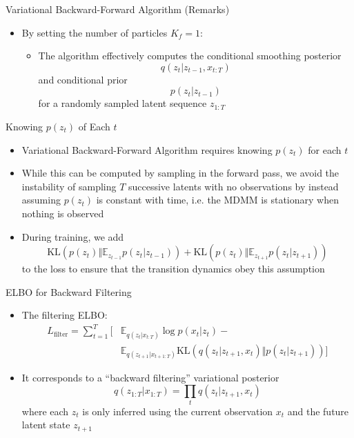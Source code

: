 \documentclass{beamer}
\begin{document}
\begin{frame}{Variational Backward-Forward Algorithm (Remarks)}
\begin{itemize}
\item By setting the number of particles $K_f=1$:
\begin{itemize}
\item The algorithm effectively computes the conditional smoothing posterior\[
q(z_t|z_{t-1},x_{t:T})
\]and conditional prior \[
p(z_t|z_{t-1})
\] for a randomly sampled latent sequence $z_{1:T}$
\end{itemize}
\end{itemize}
\end{frame}

\begin{frame}{Knowing $p(z_t)$ of Each $t$}
\begin{itemize}
\item Variational Backward-Forward Algorithm requires knowing $p(z_t)$ for each $t$
\item While this can be computed by sampling in the forward pass, we avoid the instability of sampling $T$ successive latents with no observations by instead assuming $p(z_t)$ is constant with time, i.e. the MDMM is stationary when nothing is observed
\item During training, we add\[
\text{KL}\left(p(z_t)\Vert\mathbb{E}_{z_{t-1}}p(z_t|z_{t-1})\right)+\text{KL}\left(p(z_t)\Vert\mathbb{E}_{z_{t+1}}p(z_t|z_{t+1})\right)
\]to the loss to ensure that the transition dynamics obey this assumption
\end{itemize}
\end{frame}

\begin{frame}{ELBO for Backward Filtering}
\begin{itemize}
\item The filtering ELBO:\[
\begin{split}
L_\text{filter}=\sum_{t=1}^T[&\mathbb{E}_{q(z_t|x_{t:T})}\log p(x_t|z_t)-\\
&\mathbb{E}_{q(z_{t+1}|x_{t+1:T})}\text{KL}(q(z_t|z_{t+1},x_t)\Vert p(z_t|z_{t+1}))]
\end{split}
\]
\item It corresponds to a ``backward filtering'' variational posterior\[
q(z_{1:T}|x_{1:T})=\prod_t q(z_t|z_{t+1},x_t)
\]where each $z_t$ is only inferred using the current observation $x_t$ and the future latent state $z_{t+1}$
\end{itemize}
\end{frame}
\end{document}
